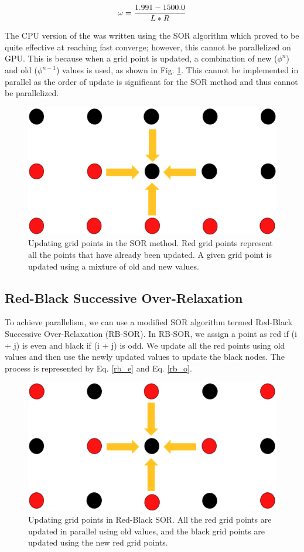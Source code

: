 \begin{equation}{\label{omg}}
\omega = \frac{1.991 - 1500.0}{L*R}
\end{equation}

The CPU version of the {\tdsim} was written using the SOR algorithm which proved to be quite effective at reaching fast converge; however, this cannot be parallelized on GPU. This is because when a grid point is updated, a combination of new ($\phi^{n}$) and old ($\phi^{n-1}$) values is used, as shown in Fig. \ref{fig:sor_methods}. This cannot be implemented in parallel as the order of update is significant for the SOR method and thus cannot be parallelized.


\begin{figure}[!htb]
\centering
\includegraphics[width=0.4\linewidth]{ch4/figs/SOR.png}
\caption{\label{fig:sor_methods} Updating grid points in the SOR method. Red grid points represent all the points that have already been updated. A given grid point is updated using a mixture of old and new values.}
\end{figure}

\subsection{Red-Black Successive Over-Relaxation}
To achieve parallelism, we can use a modified SOR algorithm termed Red-Black Successive Over-Relaxation (RB-SOR)\cite{RB_SOR_paper}. In RB-SOR, we assign a point as red if (i + j) is even and black if (i + j) is odd. We update all the red points using old values and then use the newly updated values to update the black nodes. The process is represented by Eq. \ref{rb_e} and Eq. \ref{rb_o}.


\begin{figure}[!htb]
\centering
 \includegraphics[width=0.4\linewidth]{ch4/figs/RB-SOR.png}
\caption{\label{fig:rb_sor_methods} Updating grid points in Red-Black SOR. All the red grid points are updated in parallel using old values, and the black grid points are updated using the new red grid points.}
\end{figure}


